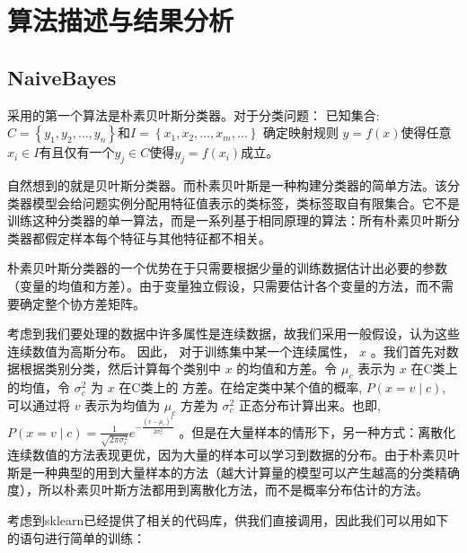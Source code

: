 \documentclass{zjureport}
\begin{document}
\section{算法描述与结果分析}
    \subsection{NaiveBayes}
    采用的第一个算法是朴素贝叶斯分类器。对于分类问题：
已知集合: $C=\left\{y_{1}, y_{2}, \ldots, y_{n}\right\}$和$ I=\left\{x_{1}, x_{2}, \ldots, x_{m}, \ldots\right\}$  确定映射规则 $ y=f(x)$使得任意$
x_{i} \in I $有且仅有一个$y_{j} \in C$使得$ y_{j}=f\left(x_{i}\right)$成立。

自然想到的就是贝叶斯分类器。而朴素贝叶斯是一种构建分类器的简单方法。该分类器模型会给问题实例分配用特征值表示的类标签，类标签取自有限集合。它不是训练这种分类器的单一算法，而是一系列基于相同原理的算法：所有朴素贝叶斯分类器都假定样本每个特征与其他特征都不相关。

朴素贝叶斯分类器的一个优势在于只需要根据少量的训练数据估计出必要的参数（变量的均值和方差）。由于变量独立假设，只需要估计各个变量的方法，而不需要确定整个协方差矩阵。


考虑到我们要处理的数据中许多属性是连续数据，故我们采用一般假设，认为这些连续数值为高斯分布。 因此， 对于训练集中某一个连续属性， $x$ 。我们首先对数据根据类别分类，然后计算每个类别中 $x$ 的均值和方差。令 $\mu_{c}$ 表示为 $x$ 在C类上的均值，令 $\sigma_{c}^{2}$ 为 $x$ 在C类上的 方差。在给定类中某个值的概率, $P(x=v \mid c)$, 可以通过将 $v$ 表示为均值为 $\mu_{c}$ 方差为 $\sigma_{c}^{2}$ 正态分布计算出来。也即, $P(x=v \mid c)=\frac{1}{\sqrt{2 \pi \sigma_{c}^{2}}} e^{-\frac{\left(v-\mu_{c}\right)^{2}}{2 \sigma_{c}^{2}}}$ 。但是在大量样本的情形下，另一种方式：离散化连续数值的方法表现更优，因为大量的样本可以学习到数据的分布。由于朴素贝叶斯是一种典型的用到大量样本的方法（越大计算量的模型可以产生越高的分类精确度），所以朴素贝叶斯方法都用到离散化方法，而不是概率分布估计的方法。


    考虑到sklearn已经提供了相关的代码库，供我们直接调用，因此我们可以用如下的语句进行简单的训练：
    
    
\end{document}
